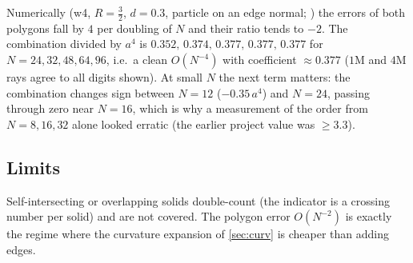Numerically (w4, $R=\frac32$, $d=0.3$, particle on an edge normal; ) the errors of both polygons fall by $4$ per
doubling of $N$ and their ratio tends to $-2$. The combination divided by $a^4$ is $0.352,\,0.374,\,0.377,\,0.377,\,0.377$ for $N=24,32,48,64,96$, i.e.\ a clean $O(N^{-4})$ with
coefficient $\approx0.377$ ($1$M and $4$M rays agree to all digits shown). At small $N$ the next term matters: the combination changes sign between $N=12$ ($-0.35\,a^4$) and
$N=24$, passing through zero near $N=16$, which is why a measurement of the order from $N=8,16,32$ alone looked erratic (the earlier project value was $\ge3.3$). 

\subsection{Limits}
Self-intersecting or overlapping solids double-count (the indicator is a crossing number per solid) and are not covered.
The polygon error $O(N^{-2})$ is exactly the regime where the curvature expansion of \cref{sec:curv} is cheaper than adding edges.
